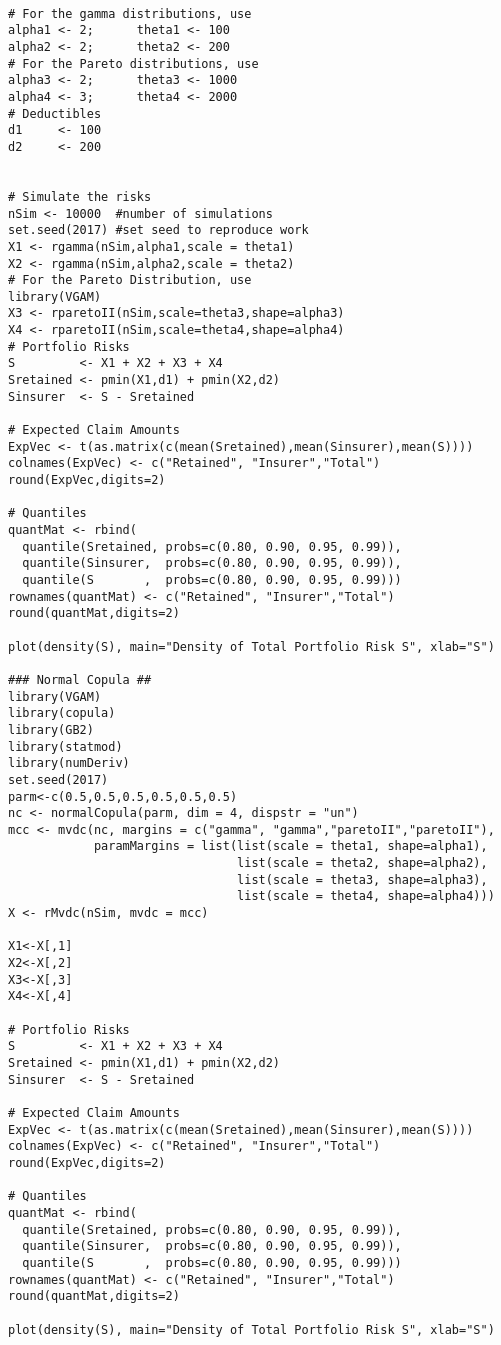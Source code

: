 \documentclass[]{book}
\theoremstyle{definition}
\theoremstyle{definition}
\theoremstyle{definition}
\theoremstyle{remark}
\begin{document}
\hypertarget{display.Sim.2}{}
\begin{verbatim}

# For the gamma distributions, use
alpha1 <- 2;      theta1 <- 100
alpha2 <- 2;      theta2 <- 200
# For the Pareto distributions, use
alpha3 <- 2;      theta3 <- 1000
alpha4 <- 3;      theta4 <- 2000
# Deductibles
d1     <- 100
d2     <- 200


# Simulate the risks
nSim <- 10000  #number of simulations
set.seed(2017) #set seed to reproduce work 
X1 <- rgamma(nSim,alpha1,scale = theta1)  
X2 <- rgamma(nSim,alpha2,scale = theta2)  
# For the Pareto Distribution, use
library(VGAM)
X3 <- rparetoII(nSim,scale=theta3,shape=alpha3)
X4 <- rparetoII(nSim,scale=theta4,shape=alpha4)
# Portfolio Risks
S         <- X1 + X2 + X3 + X4
Sretained <- pmin(X1,d1) + pmin(X2,d2)
Sinsurer  <- S - Sretained

# Expected Claim Amounts
ExpVec <- t(as.matrix(c(mean(Sretained),mean(Sinsurer),mean(S))))
colnames(ExpVec) <- c("Retained", "Insurer","Total")
round(ExpVec,digits=2)

# Quantiles
quantMat <- rbind(
  quantile(Sretained, probs=c(0.80, 0.90, 0.95, 0.99)),
  quantile(Sinsurer,  probs=c(0.80, 0.90, 0.95, 0.99)),
  quantile(S       ,  probs=c(0.80, 0.90, 0.95, 0.99)))
rownames(quantMat) <- c("Retained", "Insurer","Total")
round(quantMat,digits=2)

plot(density(S), main="Density of Total Portfolio Risk S", xlab="S")

### Normal Copula ##
library(VGAM)
library(copula)
library(GB2)
library(statmod)
library(numDeriv)
set.seed(2017)
parm<-c(0.5,0.5,0.5,0.5,0.5,0.5)
nc <- normalCopula(parm, dim = 4, dispstr = "un")
mcc <- mvdc(nc, margins = c("gamma", "gamma","paretoII","paretoII"), 
            paramMargins = list(list(scale = theta1, shape=alpha1),
                                list(scale = theta2, shape=alpha2),
                                list(scale = theta3, shape=alpha3),
                                list(scale = theta4, shape=alpha4)))
X <- rMvdc(nSim, mvdc = mcc)

X1<-X[,1]
X2<-X[,2]
X3<-X[,3]
X4<-X[,4]

# Portfolio Risks
S         <- X1 + X2 + X3 + X4
Sretained <- pmin(X1,d1) + pmin(X2,d2)
Sinsurer  <- S - Sretained

# Expected Claim Amounts
ExpVec <- t(as.matrix(c(mean(Sretained),mean(Sinsurer),mean(S))))
colnames(ExpVec) <- c("Retained", "Insurer","Total")
round(ExpVec,digits=2)

# Quantiles
quantMat <- rbind(
  quantile(Sretained, probs=c(0.80, 0.90, 0.95, 0.99)),
  quantile(Sinsurer,  probs=c(0.80, 0.90, 0.95, 0.99)),
  quantile(S       ,  probs=c(0.80, 0.90, 0.95, 0.99)))
rownames(quantMat) <- c("Retained", "Insurer","Total")
round(quantMat,digits=2)

plot(density(S), main="Density of Total Portfolio Risk S", xlab="S")
\end{verbatim}
\end{document}
